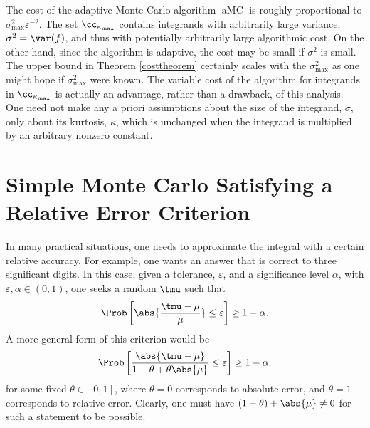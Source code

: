 \documentclass[graybox]{svmult}
\DeclareMathOperator{\aMC}{aMC}
\begin{document}
The cost of the adaptive Monte Carlo algorithm $\aMC$ is roughly proportional to $\sigma^2_{\max}\varepsilon^{-2}$.  The set $\cc_{\kappa_{\max}}$ contains integrands with arbitrarily large variance, $\sigma^2=\var(f)$, and thus with potentially arbitrarily large algorithmic cost.  On the other hand, since the algorithm is adaptive, the cost may be small if $\sigma^2$ is small.  The upper bound in Theorem \ref{costtheorem} certainly scales with the $\sigma^2_{\max}$ as one might hope if $\sigma^2_{\max}$ were known.  The variable cost of the algorithm for integrands in $\cc_{\kappa_{\max}}$ is actually an advantage, rather than a drawback, of this analysis.  One need not make any a priori assumptions about the size of the integrand, $\sigma$, only about its kurtosis, $\kappa$, which is unchanged when the integrand is multiplied by an arbitrary nonzero constant.

\section{Simple Monte Carlo Satisfying a Relative Error Criterion} \label{relerrsec}

In many practical situations, one needs to approximate the integral with a certain relative accuracy.  For example, one wants an answer that is correct to three significant digits.  In this case, given a tolerance, $\varepsilon$, and a significance level $\alpha$, with $\varepsilon, \alpha \in (0, 1)$, one seeks a random $\tmu$ such that 
\begin{equation} \label{relerrcrit}
\Prob\left[\abs{\frac{\tmu-\mu}{\mu}} \le \varepsilon \right] \geq 1-\alpha.
\end{equation}
A more general form of this criterion would be
\begin{equation} \label{genrelerrcrit}
\Prob\left[\frac{\abs{\tmu-\mu}} {1-\theta + \theta\abs{\mu}} \le \varepsilon \right] \geq 1-\alpha.
\end{equation}
for some fixed $\theta \in [0,1]$, where $\theta=0$ corresponds to absolute error, and $\theta = 1$ corresponds to relative error.
Clearly, one must have $(1-\theta) + \abs{\mu}\ne0$ for such a statement to be possible.  
\end{document}
